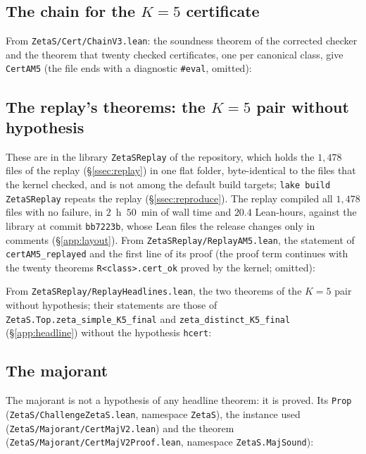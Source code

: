 
\subsection{The chain for the \texorpdfstring{$K=5$}{K=5} certificate}\label{app:chain}
From \texttt{ZetaS/Cert/ChainV3.lean}: the soundness theorem of the corrected checker and the theorem that twenty checked certificates, one
per canonical class, give \texttt{CertAM5} (the file ends with a diagnostic \texttt{\#eval}, omitted):


\subsection{The replay's theorems: the \texorpdfstring{$K=5$}{K=5} pair without hypothesis}\label{app:replay}
These are in the library \texttt{ZetaSReplay} of the repository, which holds the $1{,}478$ files of the replay (\S\ref{ssec:replay}) in one
flat folder, byte-identical to the files that the kernel checked, and is not among the default build targets; \texttt{lake build
ZetaSReplay} repeats the replay (\S\ref{ssec:reproduce}). The replay compiled all $1{,}478$ files with no failure, in $2$~h~$50$~min of
wall time and $20.4$ Lean-hours, against the library at commit
\texttt{bb7223b}, whose Lean files the release changes only in comments (\S\ref{app:layout}). From \texttt{ZetaSReplay/ReplayAM5.lean}, the
statement of \texttt{certAM5\_replayed} and the first line of its proof (the proof term continues with the twenty theorems
\texttt{R<class>.cert\_ok} proved by the kernel; omitted):


From \texttt{ZetaSReplay/ReplayHeadlines.lean}, the two theorems of the $K=5$ pair without hypothesis; their statements are those of
\texttt{ZetaS.Top.zeta\_simple\_K5\_final} and \texttt{zeta\_distinct\_K5\_final} (\S\ref{app:headline}) without the hypothesis
\texttt{hcert}:


\subsection{The majorant}\label{app:majorant}
The majorant is not a hypothesis of any headline theorem: it is proved. Its \texttt{Prop} (\texttt{ZetaS/ChallengeZetaS.lean}, namespace
\texttt{ZetaS}), the instance used (\texttt{ZetaS/Majorant/CertMajV2.lean}) and the theorem (\texttt{ZetaS/Majorant/CertMajV2Proof.lean},
namespace \texttt{ZetaS.MajSound}):

